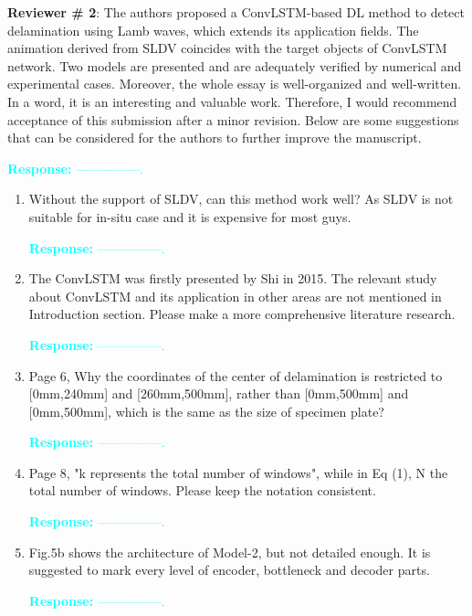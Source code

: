 \documentclass[11pt,a2paper]{report}
\begin{document}
\newpage 
\textbf{Reviewer \# 2}:
\newline The authors proposed a ConvLSTM-based DL method to detect delamination 
using Lamb waves, which extends its application fields. The animation derived 
from SLDV coincides with the target objects of ConvLSTM network. Two models are 
presented and are adequately verified by numerical and experimental cases. 
Moreover, the whole essay is well-organized and well-written. In a word, it is 
an interesting and valuable work. Therefore, I would recommend acceptance of 
this submission after a minor revision. Below are some suggestions that can be 
considered for the authors to further improve the manuscript.

\textcolor{Cyan}{
	\newline\textbf{Response:}
	---------------.
}
\begin{enumerate}
	\item Without the support of SLDV, can this method work well? As SLDV is 
	not suitable for in-situ case and it is expensive for most guys.
	
	\textcolor{Cyan}{
		\textbf{Response:}
		---------------.
	}
	
	\item The ConvLSTM was firstly presented by Shi in 2015. The relevant study 
	about ConvLSTM and its application in other areas are not mentioned in 
	Introduction section. Please make a more comprehensive literature research.
	
	\textcolor{Cyan}{
		\textbf{Response:}
		---------------.
	}
	\item Page 6, Why the coordinates of the center of delamination is 
	restricted to [0mm,240mm] and [260mm,500mm], rather than [0mm,500mm] and 
	[0mm,500mm], which is the same as the size of specimen plate?
	
	\textcolor{Cyan}{
		\textbf{Response:}
		---------------.
	}
	
	\item Page 8, "k represents the total number of windows", while in Eq (1), 
	N the total number of windows. Please keep the notation consistent.
	
	\textcolor{Cyan}{
		\textbf{Response:}
		---------------.
	}	
	
	\item Fig.5b shows the architecture of Model-2, but not detailed enough. It 
	is suggested to mark every level of encoder, bottleneck and decoder parts.
	
	\textcolor{Cyan}{
		\textbf{Response:}
		---------------.
	}
	

\end{enumerate}
\end{document}
